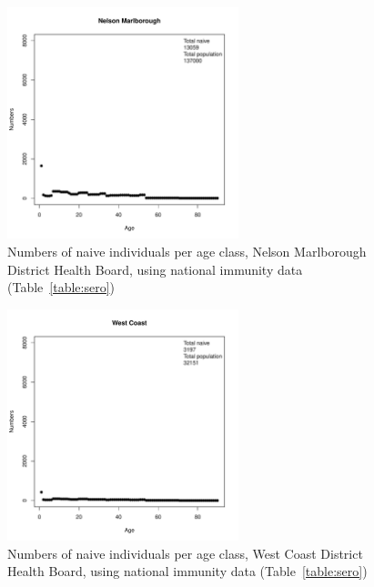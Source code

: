 \documentclass{article}
\begin{document}
\begin{figure}[H]
     \begin{center}
     \includegraphics[width=0.6\textwidth]{dhb16.pdf}
     \end{center}
     \caption{Numbers of naive individuals per age class, Nelson Marlborough District Health Board, using national immunity data (Table~\ref{table:sero})}
     \label{fig:NelsonMarlborough}
\end{figure}

\begin{figure}[H]
     \begin{center}
     \includegraphics[width=0.6\textwidth]{dhb17.pdf}
     \end{center}
     \caption{Numbers of naive individuals per age class, West Coast District Health Board, using national immunity data (Table~\ref{table:sero})}
     \label{fig:WestCoast}
\end{figure}
\end{document}
